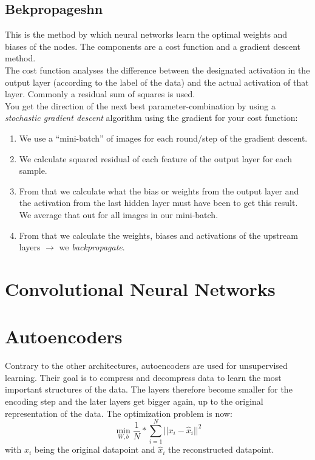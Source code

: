 \documentclass[
]{book}
\begin{document}
\hypertarget{bekpropageshn}{%
\subsection{Bekpropageshn}\label{bekpropageshn}}

This is the method by which neural networks learn the optimal weights
and biases of the nodes. The components are a cost function and a
gradient descent method.\\
The cost function analyses the difference between the designated
activation in the output layer (according to the label of the data) and
the actual activation of that layer. Commonly a residual sum of squares
is used.\\
You get the direction of the next best parameter-combination by using a
\emph{stochastic gradient descent} algorithm using the gradient for your cost
function:

\begin{enumerate}
\def\labelenumi{\arabic{enumi}.}
\item
  We use a ``mini-batch'' of images for each round/step of the gradient
  descent.
\item
  We calculate squared residual of each feature of the output layer
  for each sample.
\item
  From that we calculate what the bias or weights from the output
  layer and the activation from the last hidden layer must have been
  to get this result. We average that out for all images in our
  mini-batch.
\item
  From that we calculate the weights, biases and activations of the
  upstream layers \(\rightarrow\) we \emph{backpropagate}.
\end{enumerate}

\hypertarget{convolutional-neural-networks}{%
\section{Convolutional Neural Networks}\label{convolutional-neural-networks}}

\hypertarget{autoencoders}{%
\section{Autoencoders}\label{autoencoders}}

Contrary to the other architectures, autoencoders are used for
unsupervised learning. Their goal is to compress and decompress data to
learn the most important structures of the data. The layers therefore
become smaller for the encoding step and the later layers get bigger
again, up to the original representation of the data. The optimization
problem is now:
\[\min_{W,b} \frac{1}{N}*\sum_{i=1}^N ||x_i - \hat{x}_i||^2\] with \(x_i\)
being the original datapoint and \(\hat{x}_i\) the reconstructed
datapoint.
\end{document}

